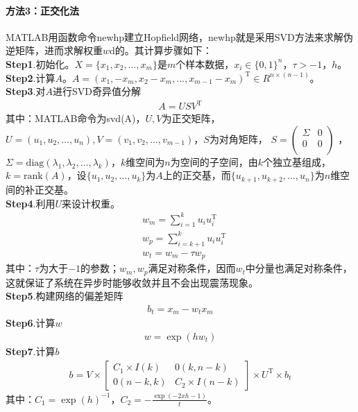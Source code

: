             \paragraph{方法3：正交化法}MATLAB用函数命令newhp建立Hopfield网络，newhp就是采用SVD方法来求解伪逆矩阵，进而求解权重$w$d的。其计算步骤如下：\\
            \textbf{Step1}.初始化。$X=\{x_1,x_2,\dots,x_m\}$是$m$个样本数据，$x_i\in \{0,1\}^n$，$\tau>-1$，$h$。\\
            \textbf{Step2}.计算$A$。$A = (x_1,-x_m,x_2-x_m,\dots,x_{m-1}-x_m)^\mathrm{T}\in R^{n\times (n-1)}$。\\
            \textbf{Step3}.对$A$进行SVD奇异值分解
            \begin{align*}
            A = USV^\mathrm{T}
            \end{align*}
            其中：MATLAB命令为svd(A)，$U,V$为正交矩阵，$U = (u_1,u_2,\dots,u_n),V = (v_1,v_2,\dots,v_{m-1})$，$S$为对角矩阵，
            \begin{math}
            S=
            \left(
            \begin{smallmatrix}
            \Sigma & 0\\
            0&0\\
            \end{smallmatrix}
             \right)
            \end{math}
            ，$\Sigma=\mathrm{diag}(\lambda_1,\lambda_2,\dots,\lambda_k)$，$k$维空间为$n$为空间的子空间，由$k$个独立基组成，$k = \mathrm{rank}(A)$，设$\{u_1,u_2,\dots,u_k\}$为$A$上的正交基，而$\{u_{k+1},u_{k+2},\dots,u_n\}$为$n$维空间的补正交基。\\
            \textbf{Step4}.利用$U$来设计权重。
            \begin{align*}
            & w_m = \sum_{i=1}^ku_iu_i^\mathrm{T}\\
            & w_p = \sum_{i=k+1}^ku_iu_i^\mathrm{T}\\
            & w_t = w_m - \tau w_p
            \end{align*}
            其中：$\tau$为大于$-1$的参数；$w_m,w_p$满足对称条件，因而$w_t$中分量也满足对称条件，这就保证了系统在异步时能够收敛并且不会出现震荡现象。\\
            \textbf{Step5}.构建网络的偏差矩阵
            \begin{align*}
            b_t = x_m - w_tx_m
            \end{align*}
            \textbf{Step6}.计算$w$
            \begin{align*}
            w = \exp(hw_t)
            \end{align*}
            \textbf{Step7}.计算$b$
            \begin{align*}
            b = V\times
            \begin{bmatrix}
            C_1\times I(k) & 0(k,n-k)\\
            0(n-k,k)&C_2\times I(n-k)
            \end{bmatrix}
            \times U^\mathrm{T}\times b_t
            \end{align*}
            其中：$C_1 = \exp(h)^{-1}$，$C_2 = -\frac{\exp(-2xh-1)}{t}$。
